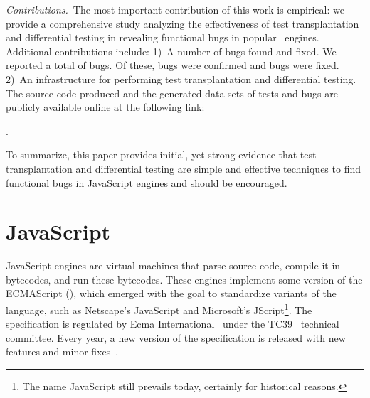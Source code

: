 \documentclass[smallextended]{svjour3}
\begin{document}
\emph{Contributions.}~The most important contribution of this work is
empirical: we provide a comprehensive study analyzing the
effectiveness of test transplantation and differential testing in
revealing functional bugs in popular \javascript\ engines.  Additional
contributions include: 1)~A number of bugs found and fixed.  We
reported a total of \totalBugsReported bugs.  Of these,
\totalBugsConfirmed bugs were confirmed and \totalBugsFixed bugs were
fixed.  2)~An infrastructure for performing test transplantation and
differential testing. The source code produced and the generated data sets of tests
and bugs are publicly available online at the following link:

\dataRepo.

\vspace{1ex} To summarize, this paper provides initial, yet strong
evidence that test transplantation and differential testing are simple
and effective techniques to find functional bugs in JavaScript engines
and should be encouraged.

\section{JavaScript}
\label{sec:es6-design}
\label{sec:imp-dep-behavior}

JavaScript engines are virtual machines that parse source code,
compile it in bytecodes, and run these bytecodes. These engines
implement some version of the ECMAScript (\es{}), which emerged with
the goal to standardize variants of the language, such as Netscape's
JavaScript and Microsoft's JScript\footnote{The name JavaScript still
  prevails today, certainly for historical reasons.}. The \es{}
specification is regulated by Ecma International~\cite{es6-website}
under the TC39~\cite{tc39-github} technical committee.  Every year, a
new version of the \es{} specification is released with new features
and minor fixes~\cite{ecmas262-spec-repo,ecmas262-spec}.

\end{document}
